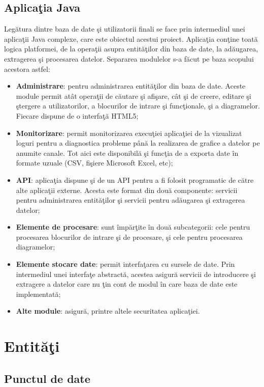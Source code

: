 \subsection{Aplicaţia Java}
Legătura dintre baza de date şi utilizatorii finali se face prin intermediul unei aplicaţii Java complexe, care este obiectul acestui proiect. Aplicaţia conţine toată logica platformei, de la operaţii asupra entităţilor din baza de date, la adăugarea,  extragerea şi procesarea datelor. 
Separarea modulelor s-a făcut pe baza scopului acestora astfel:
\begin{itemize}
	\item \textbf{Administrare}: pentru administrarea entităţilor din baza de date. Aceste module permit atât operaţii de căutare şi afişare, cât şi de creere, editare şi ştergere a utilizatorilor, a blocurilor de intrare şi funcţionale, şi a diagramelor. Fiecare dispune de o interfaţă HTML5;
	\item \textbf{Monitorizare}: permit monitorizarea execuţiei aplicaţiei de la vizualizat loguri pentru a diagnostica probleme până la realizarea de grafice a datelor pe anumite canale. Tot aici este disponibilă şi funcţia de a exporta date în formate uzuale (CSV, fişiere Microsoft Excel, etc);
	\item \textbf{API}: aplicaţia dispune şi de un API pentru a fi folosit programatic de către alte aplicaţii externe. Acesta este format din două componente: servicii pentru administrarea entităţilor şi servicii pentru adăugarea şi extragerea datelor;
	\item \textbf{Elemente de procesare}: sunt împărţite în două subcategorii: cele pentru procesarea blocurilor de intrare şi de procesare, şi cele pentru procesarea diagramelor;
	\item \textbf{Elemente stocare date}: permit interfaţarea cu sursele de date. Prin intermediul unei interfaţe abstractă, acestea asigură servicii de introducere şi extragere a datelor care nu ţin cont de modul în care baza de date este implementată;
	\item \textbf{Alte module}: asigură, printre altele securitatea aplicaţiei.
\end{itemize}

\section{Entităţi}
\subsection{Punctul de date}

